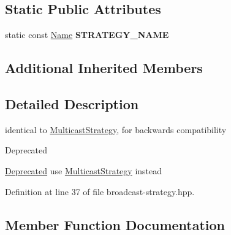 \subsection*{Static Public Attributes}
\begin{DoxyCompactItemize}
\item 
static const \hyperlink{classndn_1_1Name}{Name} {\bfseries S\+T\+R\+A\+T\+E\+G\+Y\+\_\+\+N\+A\+ME}\hypertarget{classnfd_1_1fw_1_1BroadcastStrategy_af48ced93ae595b2ee307c393fbf0f312}{}\label{classnfd_1_1fw_1_1BroadcastStrategy_af48ced93ae595b2ee307c393fbf0f312}

\end{DoxyCompactItemize}
\subsection*{Additional Inherited Members}


\subsection{Detailed Description}
identical to \hyperlink{classnfd_1_1fw_1_1MulticastStrategy}{Multicast\+Strategy}, for backwards compatibility 

\begin{DoxyRefDesc}{Deprecated}
\item[\hyperlink{deprecated__deprecated000046}{Deprecated}]use \hyperlink{classnfd_1_1fw_1_1MulticastStrategy}{Multicast\+Strategy} instead \end{DoxyRefDesc}


Definition at line 37 of file broadcast-\/strategy.\+hpp.



\subsection{Member Function Documentation}
